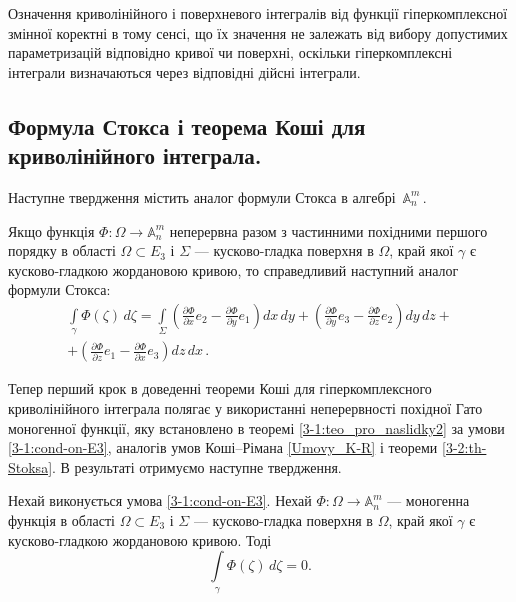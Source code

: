 \documentclass[11pt, reqno]{amsart}
\begin{document}
Означення криволінійного і поверхневого інтегралів від
функції гіперкомплексної змінної коректні в тому сенсі, що їх
значення не залежать від вибору допустимих параметризацій
відповідно кривої чи поверхні, оскільки гіперкомплексні інтеграли
визначаються через відповідні дійсні інтеграли.


\subsection{Формула Стокса і теорема Коші для криволінійного інтеграла.}

Наступне твердження містить аналог формули Стокса в алгебрі\, $\mathbb{A}_n^m$\,.


\begin{theorem}\label{3-2:th-Stoksa}
Якщо функція $\Phi:\Omega\rightarrow\mathbb{A}_n^m$ неперервна
разом з частинними похідними першого порядку в області $\Omega\subset E_3$ і $\Sigma$ --- кусково-гладка поверхня в
$\Omega$, край якої  $\gamma$ є кусково-гладкою жордановою кривою,
то справедливий наступний аналог формули Стокса:
\begin{multline*}
\int\limits_{\gamma}\Phi(\zeta)\,d\zeta=\int\limits_{\Sigma}\left(\frac{\partial\Phi}{\partial
x}e_{2}-\frac{\partial\Phi}{\partial y}e_1\right)dx\,dy
+\left(\frac{\partial\Phi}{\partial
y}e_{3}-\frac{\partial\Phi}{\partial z}e_{2}\right)dy\,dz+\\
+\left(\frac{\partial\Phi}{\partial
z}e_1-\frac{\partial\Phi}{\partial x}e_{3}\right)dz\,dx\,.
\end{multline*}
\end{theorem}

Тепер перший крок в доведенні теореми Коші для гіпер\-комп\-лекс\-но\-го криволінійного інтеграла
полягає у використанні неперервності
похідної Гато моногенної функції, яку встановлено в теоремі \ref{3-1:teo_pro_naslidky2}
за умови \eqref{3-1:cond-on-E3}, аналогів умов Коші--Рімана \eqref{Umovy_K-R} і теореми \ref{3-2:th-Stoksa}.
В результаті отримуємо наступне твердження.


\begin{theorem}\label{3-2:teo-int-po-kryv-z-neper-poh}
Нехай виконується умова \eqref{3-1:cond-on-E3}. Нехай
$\Phi : \Omega\rightarrow\mathbb{A}_n^m$ --- моногенна функція в області
$\Omega\subset E_3$ і $\Sigma$ --- кусково-гладка поверхня в $\Omega$,
край якої $\gamma$ є кусково-гладкою жордановою кривою.
Тоді
\begin{equation}\label{3-2:form-Koshi-po-kryv}
\int\limits_{\gamma}\Phi(\zeta)\,d\zeta=0.
\end{equation}
\end{theorem}
\end{document}
